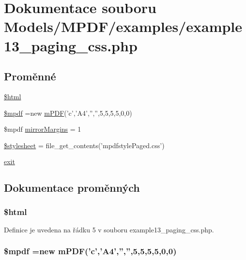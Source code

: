 \hypertarget{example13__paging__css_8php}{\section{Dokumentace souboru Models/\-M\-P\-D\-F/examples/example13\-\_\-paging\-\_\-css.php}
\label{example13__paging__css_8php}
}
\subsection*{Proměnné}
\begin{DoxyCompactItemize}
\item 
\hyperlink{example13__paging__css_8php_a6f96e7fc92441776c9d1cd3386663b40}{\$html}
\item 
\hyperlink{example13__paging__css_8php_ad028f81910d6cbab9b184d2214b3a8f8}{\$mpdf} =new \hyperlink{classm_p_d_f}{m\-P\-D\-F}('c','A4','','',5,5,5,5,0,0)
\item 
\$mpdf \hyperlink{example13__paging__css_8php_a24c284cb7774410f65953584ea1fd9c1}{mirror\-Margins} = 1
\item 
\hyperlink{example13__paging__css_8php_a19e5cf73e817c55a49205e6ec78c88a8}{\$stylesheet} = file\-\_\-get\-\_\-contents('mpdfstyle\-Paged.\-css')
\item 
\hyperlink{example13__paging__css_8php_a6733eb5f605d09eaede9845835d71c4e}{exit}
\end{DoxyCompactItemize}


\subsection{Dokumentace proměnných}
\hypertarget{example13__paging__css_8php_a6f96e7fc92441776c9d1cd3386663b40}{
\subsubsection[{\$html}]{\setlength{\rightskip}{0pt plus 5cm}\$html}}\label{example13__paging__css_8php_a6f96e7fc92441776c9d1cd3386663b40}


Definice je uvedena na řádku 5 v souboru example13\-\_\-paging\-\_\-css.\-php.

\hypertarget{example13__paging__css_8php_ad028f81910d6cbab9b184d2214b3a8f8}{
\subsubsection[{\$mpdf}]{\setlength{\rightskip}{0pt plus 5cm}\$mpdf =new {\bf m\-P\-D\-F}('c','A4','','',5,5,5,5,0,0)}}\label{example13__paging__css_8php_ad028f81910d6cbab9b184d2214b3a8f8}


